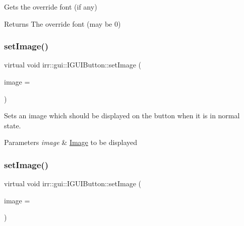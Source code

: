 Gets the override font (if any) 

\begin{DoxyReturn}{Returns}
The override font (may be 0) 
\end{DoxyReturn}
\mbox{\label{classirr_1_1gui_1_1IGUIButton_af233578beb34ba115b0197731e34a3f1}} 
\subsubsection{\texorpdfstring{set\+Image()}{setImage()}\hspace{0.1cm}{\footnotesize\ttfamily [1/4]}}
{\footnotesize\ttfamily virtual void irr\+::gui\+::\+I\+G\+U\+I\+Button\+::set\+Image (\begin{DoxyParamCaption}\item[{\hyperlink{classirr_1_1video_1_1ITexture}{video\+::\+I\+Texture} $\ast$}]{image = {} }\end{DoxyParamCaption})\hspace{0.3cm}{\ttfamily [pure virtual]}}



Sets an image which should be displayed on the button when it is in normal state. 


\begin{DoxyParams}{Parameters}
{\em image} & \hyperlink{classImage}{Image} to be displayed \\
\hline
\end{DoxyParams}
\mbox{\label{classirr_1_1gui_1_1IGUIButton_af233578beb34ba115b0197731e34a3f1}} 
\subsubsection{\texorpdfstring{set\+Image()}{setImage()}\hspace{0.1cm}{\footnotesize\ttfamily [2/4]}}
{\footnotesize\ttfamily virtual void irr\+::gui\+::\+I\+G\+U\+I\+Button\+::set\+Image (\begin{DoxyParamCaption}\item[{\hyperlink{classirr_1_1video_1_1ITexture}{video\+::\+I\+Texture} $\ast$}]{image = {} }\end{DoxyParamCaption})\hspace{0.3cm}{\ttfamily [pure virtual]}}




